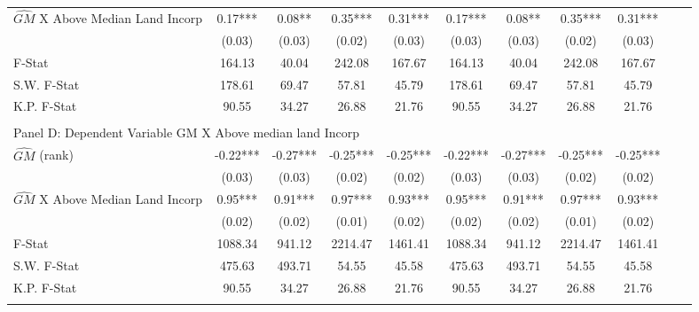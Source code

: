 \begin{table}[htbp]
\begin{threeparttable}
\begin{tabular}{l*{10}{c}}
\addlinespace
$\hat{GM}$ X Above Median Land Incorp&       0.17***&       0.08** &       0.35***&       0.31***&       0.17***&       0.08** &       0.35***&       0.31***\\
                &     (0.03)   &     (0.03)   &     (0.02)   &     (0.03)   &     (0.03)   &     (0.03)   &     (0.02)   &     (0.03)   \\
\midrule
F-Stat          &     164.13   &      40.04   &     242.08   &     167.67   &     164.13   &      40.04   &     242.08   &     167.67   \\
S.W. F-Stat     &     178.61   &      69.47   &      57.81   &      45.79   &     178.61   &      69.47   &      57.81   &      45.79   \\
K.P. F-Stat     &      90.55   &      34.27   &      26.88   &      21.76   &      90.55   &      34.27   &      26.88   &      21.76   \\
\cmidrule[\heavyrulewidth](lr){1-9} \\ \cmidrule[\heavyrulewidth](lr){1-9}
\multicolumn{8}{l}{Panel D: Dependent Variable GM X Above median land Incorp}\\
\cmidrule(lr){1-9}
$\hat{GM}$ (rank)&      -0.22***&      -0.27***&      -0.25***&      -0.25***&      -0.22***&      -0.27***&      -0.25***&      -0.25***\\
                &     (0.03)   &     (0.03)   &     (0.02)   &     (0.02)   &     (0.03)   &     (0.03)   &     (0.02)   &     (0.02)   \\
\addlinespace
$\hat{GM}$ X Above Median Land Incorp&       0.95***&       0.91***&       0.97***&       0.93***&       0.95***&       0.91***&       0.97***&       0.93***\\
                &     (0.02)   &     (0.02)   &     (0.01)   &     (0.02)   &     (0.02)   &     (0.02)   &     (0.01)   &     (0.02)   \\
\midrule
F-Stat          &    1088.34   &     941.12   &    2214.47   &    1461.41   &    1088.34   &     941.12   &    2214.47   &    1461.41   \\
S.W. F-Stat     &     475.63   &     493.71   &      54.55   &      45.58   &     475.63   &     493.71   &      54.55   &      45.58   \\
K.P. F-Stat     &      90.55   &      34.27   &      26.88   &      21.76   &      90.55   &      34.27   &      26.88   &      21.76   \\
\cmidrule[\heavyrulewidth](lr){1-9} \\ \cmidrule[\heavyrulewidth](lr){1-9}

\end{tabular}
\end{threeparttable}
\end{table}
